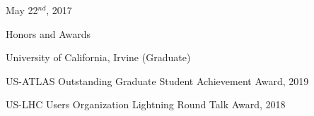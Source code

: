 \begin{minipage}{0.8\textwidth}
\begin{minipage}{0.8\textwidth}
\begin{minipage}{0.8\textwidth}
\begin{minipage}{1.0\textwidth}
May 22$^{nd}$, 2017
\end{minipage}

\end{minipage}

%
%

\vspace{0.2in}
{\Large Honors and Awards}\\
\HRule

\hspace{0.25in}
\begin{minipage}{0.8\textwidth}

    \vspace{0.15in}
    University of California, Irvine (Graduate)
    
	\vspace{0.05in}
    \hspace{0.15in}
    \begin{minipage}{1.0\textwidth}
        \vspace{0.1in}
        US-ATLAS Outstanding Graduate Student Achievement Award, 2019

        \vspace{0.1in}
        US-LHC Users Organization Lightning Round Talk Award, 2018
    \end{minipage}
\end{minipage}



\end{minipage}
\end{minipage}
